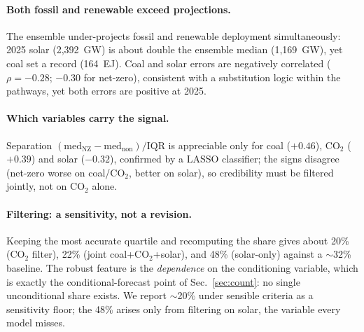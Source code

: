 \documentclass[sigconf, nonacm]{acmart}
\begin{document}
\paragraph{Both fossil and renewable exceed projections.}
The ensemble under-projects fossil and renewable deployment simultaneously: 2025 solar (2{,}392~GW) is about double the ensemble median (1{,}169~GW), yet coal set a record (164~EJ). Coal and solar errors are negatively correlated ($\rho=-0.28$; $-0.30$ for net-zero), consistent with a substitution logic within the pathways, yet both errors are positive at 2025.

\paragraph{Which variables carry the signal.}
Separation $(\text{med}_{\text{NZ}}-\text{med}_{\text{non}})/\text{IQR}$ is appreciable only for coal ($+0.46$), CO$_2$ ($+0.39$) and solar ($-0.32$), confirmed by a LASSO classifier; the signs disagree (net-zero worse on coal/CO$_2$, better on solar), so credibility must be filtered jointly, not on CO$_2$ alone.

\paragraph{Filtering: a sensitivity, not a revision.}
Keeping the most accurate quartile and recomputing the share gives about 20\% (CO$_2$ filter), 22\% (joint coal+CO$_2$+solar), and 48\% (solar-only) against a $\sim$32\% baseline. The robust feature is the \emph{dependence} on the conditioning variable, which is exactly the conditional-forecast point of Sec.~\ref{sec:count}: no single unconditional share exists. We report $\sim$20\% under sensible criteria as a sensitivity floor; the 48\% arises only from filtering on solar, the variable every model misses.

\end{document}
